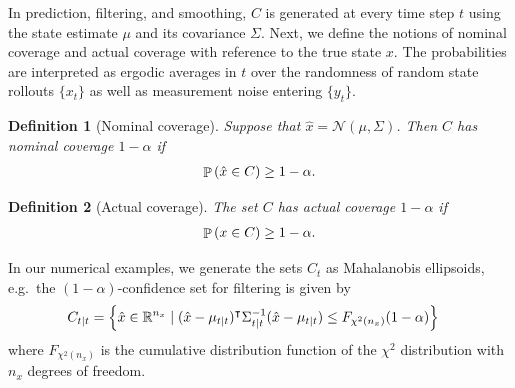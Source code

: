 \documentclass{article} %
\newtheorem{definition}{Definition}
\DeclareMathOperator{\probability}{\mathbb{P}}
\begin{document}
In prediction, filtering, and smoothing, \(C\) is generated at every time step \(t\) using the state estimate \(\mu\) and its covariance \(\Sigma\).
Next, we define the notions of nominal coverage and actual coverage with reference to the true state \(x\).
The probabilities are interpreted as ergodic averages in \(t\) over the randomness of random state rollouts \(\{x_t\}\) as well as measurement noise entering \(\{y_t\}\).
\begin{definition}[Nominal coverage]
Suppose that \(\hat x = \mathcal N(\mu, \Sigma)\).
Then \(C\) has nominal coverage \(1 - \alpha\) if
\begin{align*}
\probability\del{\hat x \in C} \geq 1-\alpha.
\end{align*}
\end{definition}
\begin{definition}[Actual coverage]
  The set \(C\) has actual coverage \(1 - \alpha\) if
  \begin{align*}
    \probability\del{x \in C} \geq 1-\alpha.
  \end{align*}
\end{definition}

In our numerical examples, we generate the sets \(C_t\) as Mahalanobis ellipsoids, e.g.~the \((1 - \alpha)\)-confidence set for filtering is given by
\begin{align}
  C_{t\mid t} &= \set{\hat x \in \mathbb R^{n_x} \mid (\hat x - \mu_{t\mid t})^\intercal \Sigma_{t\mid t}^{-1} (\hat x - \mu_{t\mid t}) \leq F_{\chi^2(n_x)}(1 - \alpha)}
\end{align}
where \(F_{\chi^2(n_x)}\) is the cumulative distribution function of the \(\chi^2\) distribution with \(n_x\) degrees of freedom.

\end{document}
